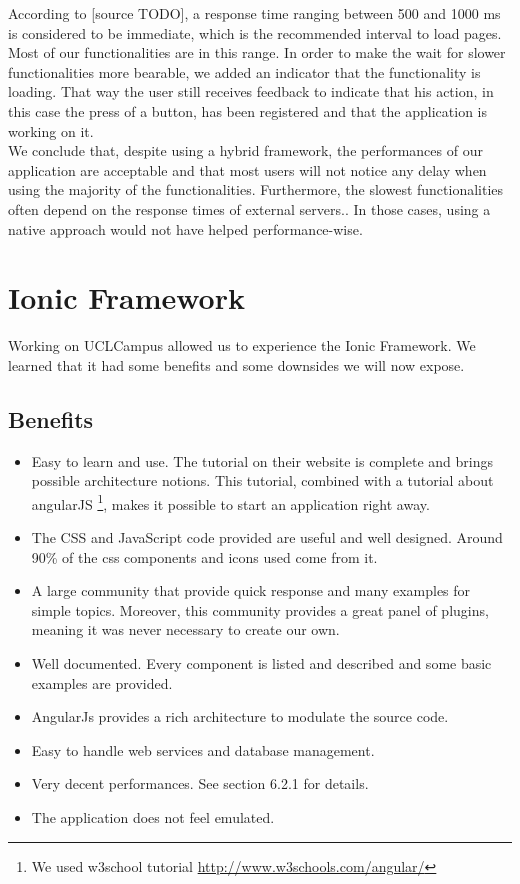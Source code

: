 \documentclass{eplmastersthesis}
\begin{document}
According to [source TODO], a response time ranging between 500 and 1000 ms is considered to be immediate, which is the recommended interval to load pages. Most of our functionalities are in this range. In order to make the wait for slower functionalities more bearable, we added an indicator that the functionality is loading. That way the user still receives feedback to indicate that his action, in this case the press of a button, has been registered and that the application is working on it. \\

We conclude that, despite using a hybrid framework, the performances of our application are acceptable and that most users will not notice any delay when using the majority of the functionalities. Furthermore, the slowest functionalities often depend on the response times of external servers.. In those cases, using a native approach would not have helped performance-wise. 

\section{Ionic Framework}
Working on UCLCampus allowed us to experience the Ionic Framework. We learned that it had some benefits and some downsides we will now expose.

\subsection{Benefits}
\begin{itemize}
\item Easy to learn and use. The tutorial on their website is complete and brings possible architecture notions. This tutorial, combined with a tutorial about angularJS \footnote{We used w3school tutorial \url{http://www.w3schools.com/angular/}}, makes it possible to start an application right away. 
\item The CSS and JavaScript code provided are useful and well designed. Around 90\% of the css components and icons used come from it.
\item A large community that provide quick response and many examples for simple topics. Moreover, this community provides a great panel of plugins, meaning it was never necessary to create our own. 
\item Well documented. Every component is listed and described and some basic examples are provided.
\item AngularJs provides a rich architecture to modulate the source code. 
\item Easy to handle web services and database management. 
\item Very decent performances. See section 6.2.1 for details.
\item The application does not feel emulated.
\end{itemize}
\end{document}
